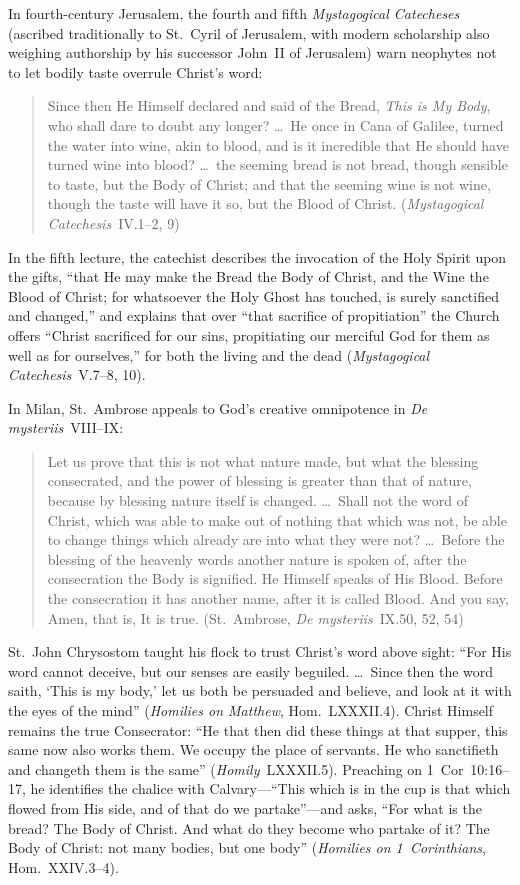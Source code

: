 In fourth-century Jerusalem, the fourth and fifth \emph{Mystagogical Catecheses} (ascribed traditionally to St.~Cyril of Jerusalem, with modern scholarship also weighing authorship by his successor John~II of Jerusalem) warn neophytes not to let bodily taste overrule Christ's word:
\begin{quotation}
Since then He Himself declared and said of the Bread, \emph{This is My Body}, who shall dare to doubt any longer? \dots\ He once in Cana of Galilee, turned the water into wine, akin to blood, and is it incredible that He should have turned wine into blood? \dots\ the seeming bread is not bread, though sensible to taste, but the Body of Christ; and that the seeming wine is not wine, though the taste will have it so, but the Blood of Christ. (\emph{Mystagogical Catechesis}~IV.1--2, 9)
\end{quotation}
In the fifth lecture, the catechist describes the invocation of the Holy Spirit upon the gifts, ``that He may make the Bread the Body of Christ, and the Wine the Blood of Christ; for whatsoever the Holy Ghost has touched, is surely sanctified and changed,'' and explains that over ``that sacrifice of propitiation'' the Church offers ``Christ sacrificed for our sins, propitiating our merciful God for them as well as for ourselves,'' for both the living and the dead (\emph{Mystagogical Catechesis}~V.7--8, 10).

In Milan, St.~Ambrose appeals to God's creative omnipotence in \emph{De mysteriis}~VIII--IX:
\begin{quotation}
Let us prove that this is not what nature made, but what the blessing consecrated, and the power of blessing is greater than that of nature, because by blessing nature itself is changed. \dots\ Shall not the word of Christ, which was able to make out of nothing that which was not, be able to change things which already are into what they were not? \dots\ Before the blessing of the heavenly words another nature is spoken of, after the consecration the Body is signified. He Himself speaks of His Blood. Before the consecration it has another name, after it is called Blood. And you say, Amen, that is, It is true. (St.~Ambrose, \emph{De mysteriis}~IX.50, 52, 54)
\end{quotation}

St.~John Chrysostom taught his flock to trust Christ's word above sight: ``For His word cannot deceive, but our senses are easily beguiled. \dots\ Since then the word saith, `This is my body,' let us both be persuaded and believe, and look at it with the eyes of the mind'' (\emph{Homilies on Matthew}, Hom.~LXXXII.4). Christ Himself remains the true Consecrator: ``He that then did these things at that supper, this same now also works them. We occupy the place of servants. He who sanctifieth and changeth them is the same'' (\emph{Homily}~LXXXII.5). Preaching on 1~Cor~10:16--17, he identifies the chalice with Calvary---``This which is in the cup is that which flowed from His side, and of that do we partake''---and asks, ``For what is the bread? The Body of Christ. And what do they become who partake of it? The Body of Christ: not many bodies, but one body'' (\emph{Homilies on 1~Corinthians}, Hom.~XXIV.3--4).

